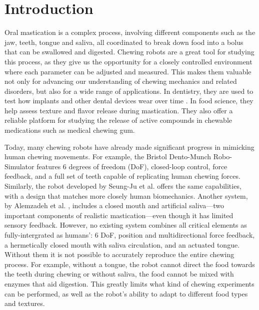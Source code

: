 \section{Introduction}


Oral mastication is a complex process, involving different components such as the jaw, teeth, tongue and saliva, all coordinated to break down food into 
a bolus that can be swallowed and digested. Chewing robots are a great tool for studying this process, as they give us the opportunity for a closely controlled environment where each parameter can be adjusted and measured. This makes them valuable not only for advancing our understanding of chewing mechanics and related disorders, but also for a wide range of applications. In dentistry, they are used to test how implants and other dental devices wear over time \cite{TAHIR2019389.e1}. In food science, they help assess texture \cite{foodScience} and flavor release during mastication. They also offer a reliable platform for studying the release of active compounds in chewable medications such as medical chewing gum.

Today, many chewing robots have already made significant progress in mimicking human chewing movements.
For example, the Bristol Dento-Munch Robo-Simulator \cite{BristolChewingRobot} features 6 degrees of freedom 
(DoF), closed-loop control, force feedback, and a full set of teeth capable of replicating human chewing forces. Similarly, the robot developed by Seung-Ju 
et al. \cite{ChewingRobotLinearActuator} offers the same capabilities, with a design that matches more closely human biomechanics. Another system, by Alemzadeh 
et al. \cite{ChewingRobotGums}, includes a closed mouth and artificial saliva—two important components of realistic mastication—even though it has limited 
sensory feedback. However, no existing system combines all critical elements as fully-intergrated as humans': 6 DoF, position and multidirectional force feedback, a hermetically closed 
mouth with saliva circulation, and an actuated tongue. Without them it is not possible to accurately reproduce the entire chewing process. For example, without 
a tongue, the robot cannot direct the food towards the teeth during chewing or without saliva, the food cannot be mixed with enzymes that aid digestion. This greatly 
limits what kind of chewing experiments can be performed, as well as the robot's ability to adapt to different food types and textures.


